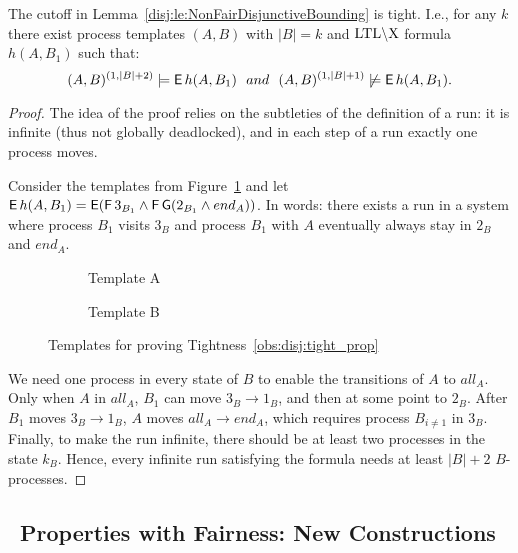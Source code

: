 \begin{tightness} \label{obs:disj:tight_prop}
    The cutoff in Lemma~\ref{disj:le:NonFairDisjunctiveBounding} is tight.
    I.e., for any $k$ there exist process templates $(A,B)$ with $|B| = k$ 
    and $\text{LTL}\backslash\text{X}$ formula $h(A,B_1)$ such that:
    $$
    (A,B)^{(1,|B|+2)} \models \operatorname{\mathsf{E}} h(A,B_1) ~~and~~ 
    (A,B)^{(1,|B|+1)} \not\models \operatorname{\mathsf{E}} h(A,B_1).
    $$
\end{tightness}
\begin{proof}
The idea of the proof relies on the subtleties of the definition of a run: it is infinite (thus not globally deadlocked), and in each step of a run exactly one process moves. 

Consider the templates from Figure~\ref{fig:obs:disj:tight_prop} and let $\operatorname{\mathsf{E}} h(A,B_1) = \operatorname{\mathsf{E}} (\operatorname{\mathsf{F}} 3_{B_1} \land \operatorname{\mathsf{F}}\operatorname{\mathsf{G}} (2_{B_1} \land {end}_A))$. In words: there exists a run in a system where process $B_1$ visits $3_B$ and process $B_1$ with $A$ eventually always stay in $2_B$ and ${end}_A$.
\begin{figure}[tb]
\centering
\begin{subfigure}[b]{0.35\textwidth}\center
\scalebox{0.66}{}
\caption*{Template A}
\end{subfigure}
\begin{subfigure}[b]{0.62\textwidth}\center
\scalebox{0.66}{}
\caption*{Template B}
\end{subfigure}
\caption{Templates for proving Tightness~\ref{obs:disj:tight_prop}}
\label{fig:obs:disj:tight_prop}
\end{figure}

We need one process in every state of $B$ to enable the transitions of $A$ to ${all}_A$. Only when $A$ in ${all}_A$, $B_1$ can move $3_B \to 1_B$, and then at some point to $2_B$. After $B_1$ moves $3_B \to 1_B$, $A$ moves ${all}_A \to {end}_A$, which requires process $B_{i \neq 1}$ in $3_B$. Finally, to make the run infinite, there should be at least two processes in the state $k_B$.
Hence, every infinite run satisfying the formula needs at least $|B|+2$ $B$-processes.
% 
\end{proof}


\subsection{\LTLmX\ Properties with Fairness: New Constructions} \label{gua:sec:ideas-disj-fair}

